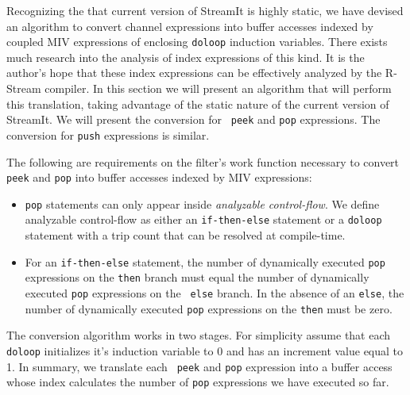 \documentclass[10pt, letterpaper, onecolumn]{article}
\begin{document}
Recognizing the that current version of StreamIt is highly static, we
have devised an algorithm to convert channel expressions into buffer
accesses indexed by coupled MIV expressions of enclosing {\tt doloop}
induction variables.  There exists much research into the analysis of
index expressions of this kind.  It is the author's hope that these
index expressions can be effectively analyzed by the R-Stream
compiler.  In this section we will present an algorithm that will
perform this translation, taking advantage of the static nature of the
current version of StreamIt.  We will present the conversion for {\tt
  peek} and {\tt pop} expressions.  The conversion for {\tt push}
expressions is similar.

The following are requirements on the filter's work function necessary
to convert {\tt peek} and {\tt pop} into buffer accesses indexed by
MIV expressions:
\begin{itemize}
\item {\tt pop} statements can only appear inside {\it analyzable control-flow}.
  We define analyzable control-flow as either an {\tt if-then-else}
  statement or a {\tt doloop} statement with a trip count that can be
  resolved at compile-time.
\item For an {\tt if-then-else} statement, the number of dynamically
  executed {\tt pop} expressions on the {\tt then} branch must equal
  the number of dynamically executed {\tt pop} expressions on the {\tt
  else} branch.  In the absence of an {\tt else}, the number of
  dynamically executed {\tt pop} expressions on the {\tt then} must be
  zero.
\end{itemize}

The conversion algorithm works in two stages.  For simplicity assume
that each {\tt doloop} initializes it's induction variable to 0 and has
an increment value equal to 1.  In summary, we translate each {\tt
peek} and {\tt pop} expression into a buffer access whose index calculates the
number of {\tt pop} expressions we have executed so far.  
\end{document}
